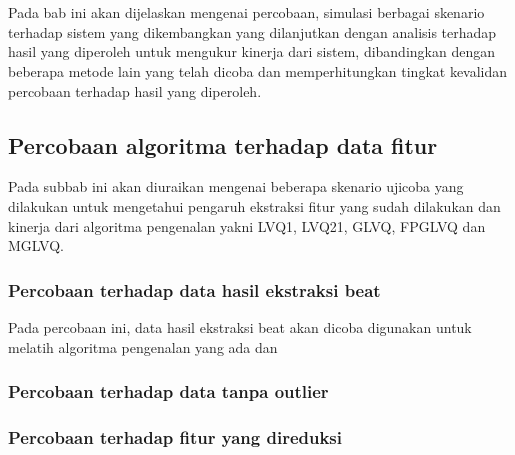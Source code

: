 \chapter{\babLima}
Pada bab ini akan dijelaskan mengenai percobaan, simulasi berbagai skenario
terhadap sistem yang dikembangkan yang dilanjutkan dengan analisis terhadap
hasil yang diperoleh untuk mengukur kinerja dari sistem, dibandingkan dengan
beberapa metode lain yang telah dicoba dan memperhitungkan tingkat kevalidan
percobaan terhadap hasil yang diperoleh.

\section{Percobaan algoritma terhadap data fitur}
Pada subbab ini akan diuraikan mengenai beberapa skenario ujicoba yang dilakukan
untuk mengetahui pengaruh ekstraksi fitur yang sudah dilakukan dan kinerja dari
algoritma pengenalan yakni LVQ1, LVQ21, GLVQ, FPGLVQ dan MGLVQ.

\subsection{Percobaan terhadap data hasil ekstraksi beat}
Pada percobaan ini, data hasil ekstraksi beat akan dicoba digunakan untuk
melatih algoritma pengenalan yang ada dan 

\subsection{Percobaan terhadap data tanpa outlier}

\subsection{Percobaan terhadap fitur yang direduksi}

